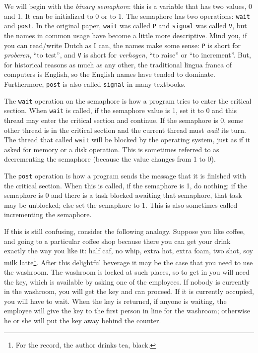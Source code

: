 We will begin with the \textit{binary semaphore}: this is a variable that has two values, 0 and 1. It can be initialized to 0 or to 1. The semaphore has two operations: \texttt{wait} and \texttt{post}. In the original paper, \texttt{wait} was called \texttt{P} and \texttt{signal} was called \texttt{V}, but the names in common usage have become a little more descriptive. Mind you, if you can read/write Dutch as I can, the names make some sense: \texttt{P} is short for \textit{proberen}, ``to test'', and \texttt{V} is short for \textit{verhogen}, ``to raise'' or ``to increment''. But, for historical reasons as much as any other, the traditional lingua franca of computers is English, so the English names have tended to dominate. Furthermore, \texttt{post} is also called \texttt{signal} in many textbooks.

The \texttt{wait} operation on the semaphore is how a program tries to enter the critical section. When \texttt{wait} is called, if the semaphore value is 1, set it to 0 and this thread may enter the critical section and continue. If the semaphore is 0, some other thread is in the critical section and the current thread must \textit{wait} its turn. The thread that called \texttt{wait} will be blocked by the operating system, just as if it asked for memory or a disk operation. This is sometimes referred to as decrementing the semaphore (because the value changes from 1 to 0).

The \texttt{post} operation is how a program sends the message that it is finished with the critical section. When this is called, if the semaphore is 1, do nothing; if the semaphore is 0 and there is a task blocked awaiting that semaphore, that task may be unblocked; else set the semaphore to 1. This is also sometimes called incrementing the semaphore.

If this is still confusing, consider the following analogy. Suppose you like coffee, and going to a particular coffee shop because there you can get your drink exactly the way you like it: half caf, no whip, extra hot, extra foam, two shot, soy milk latte\footnote{For the record, the author drinks tea, black.}. After this delightful beverage it may be the case that you need to use the washroom. The washroom is locked at such places, so to get in you will need the key, which is available by asking one of the employees. If nobody is currently in the washroom, you will get the key and can proceed. If it is currently occupied, you will have to wait. When the key is returned, if anyone is waiting, the employee will give the key to the first person in line for the washroom; otherwise he or she will put the key away behind the counter.

